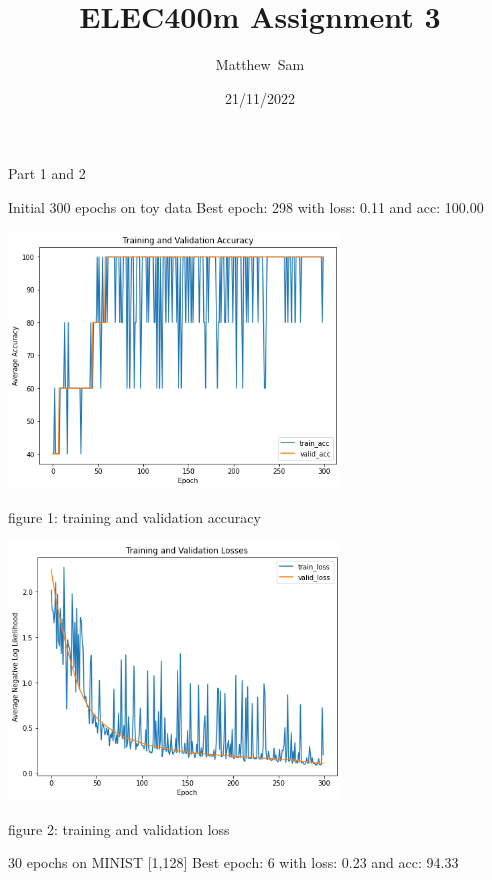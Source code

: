 \documentclass{homework}
\title{ELEC400m Assignment 3}
\author{Matthew\ Sam}
\date{21/11/2022}
\begin{document}
\maketitle

\exercise

{\Large Part 1 and 2}

Initial 300 epochs on toy data \newline
Best epoch: 298 with loss: 0.11 and acc: 100.00 \newline


\centering
\includegraphics[width=250pt]{accuracyp1.png}

{figure 1: training and validation accuracy}

\raggedright

\centering
\includegraphics[width=250pt]{lossp1.png}

{figure 2: training and validation loss}

\raggedright

\newpage
{}


30 epochs on MINIST [1,128] \newline
Best epoch: 6 with loss: 0.23 and acc: 94.33 \newline
\end{document}
